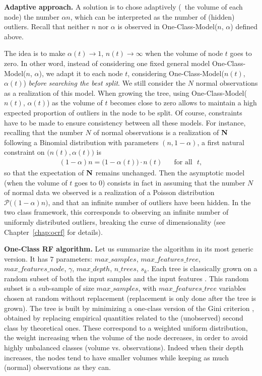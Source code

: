 \textbf{Adaptive approach.}
%
A solution is to chose adaptively (\wrt~the volume of each node) the number $\alpha n$, which can be interpreted as the number of (hidden) outliers. Recall that neither $n$ nor $\alpha$ is observed in One-Class-Model($n$, $\alpha$) defined above. 

The idea is to make $\alpha(t) \to 1$, $n(t) \to \infty$ when the volume of node $t$ goes to zero.
%
In other word, instead of considering one fixed general model One-Class-Model($n$, $\alpha$), we adapt it to each node $t$, considering One-Class-Model($n(t)$, $\alpha(t)$) \emph{before searching the best split}. We still consider the $N$ normal observations as a realization of this model. When growing the tree, using One-Class-Model($n(t)$, $\alpha(t)$) as the volume of $t$ becomes close to zero allows to maintain a high expected proportion of outliers in the node to be split.
Of course, constraints have to be made to ensure consistency between all these models.
%
For instance, recalling that the number $N$ of normal observations is a realization of $\mathbf N$ following a Binomial distribution with parameters $(n, 1-\alpha)$, a first natural constraint on $\big(n(t), \alpha(t)\big)$ is
\begin{align}
\label{constraint1}
(1-\alpha)n = \big(1-\alpha(t)\big) \cdot n(t) \text{~~~~~for all~~} t,
\end{align}
so that the expectation of $\mathbf N$ remains unchanged. 
Then the asymptotic model (when the volume of $t$ goes to $0$) consists in fact in assuming that the number $N$ of normal data we observed is a realization of a Poisson distribution $\mathcal{P}\big((1-\alpha)n\big)$, and that an infinite number of outliers have been hidden. In the two class framework, this corresponds to observing an infinite number of uniformly distributed outliers, breaking the curse of dimensionality (see Chapter~\ref{chap:ocrf} for details).


\textbf{One-Class RF algorithm.} Let us summarize the algorithm in its most generic version.
It has $7$ parameters:
$max\_samples$, $max\_features\_tree$, $max\_features\_node$, $\gamma$, $max\_depth$, $n\_trees$, $s_k$.
%
Each tree is classically grown on a random subset of both the input samples and the input features \citep{Ho1998, Panov2007}.
This random subset is a sub-sample of size $max\_samples$, with $max\_features\_tree$ variables chosen at random without replacement (replacement is only done after the tree is grown). The tree is built by minimizing 
a one-class version of the Gini criterion \citep{Gini1912}, obtained by replacing empirical quantities related to the (unobserved) second class by theoretical ones. These correspond to a weighted uniform distribution, the weight increasing when the volume of the node decreases, in order to avoid highly unbalanced classes (volume vs. observations). Indeed when their depth increases, the nodes tend to have smaller volumes while keeping as much (normal) observations as they can.

